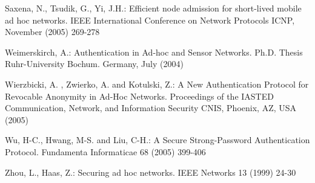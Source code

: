 \documentclass[conference]{IEEEtran}
\begin{document}
\begin{thebibliography}{10}
Saxena, N., Tsudik, G., Yi, J.H.: Efficient node admission for
short-lived mobile ad hoc networks.  IEEE International Conference
on Network Protocols ICNP,  November (2005) 269-278


 Weimerskirch, A.: Authentication in Ad-hoc and
Sensor Networks. Ph.D. Thesis Ruhr-University Bochum. Germany,
July (2004)

 Wierzbicki, A. ,  Zwierko, A. and Kotulski, Z.: A New Authentication Protocol for Revocable Anonymity in Ad-Hoc
Networks. Proceedings of the IASTED Communication, Network, and
Information Security CNIS, Phoenix, AZ, USA (2005)

 Wu, H-C., Hwang, M-S. and Liu, C-H.: A Secure
Strong-Password Authentication Protocol. Fundamenta Informaticae
68 (2005) 399-406

Zhou, L., Haas, Z.: Securing ad hoc networks. IEEE Networks 13
(1999)  24-30

\end{thebibliography}
\end{document}
